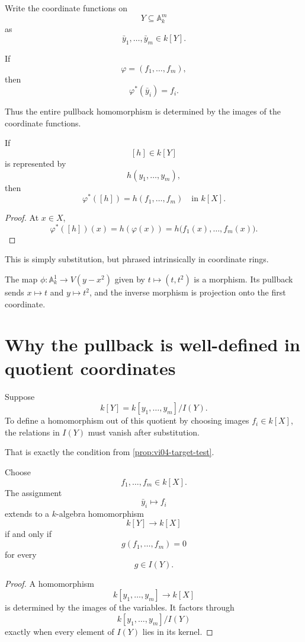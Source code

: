 Write the coordinate functions on
\[
Y\subseteq\mathbb A_k^m
\]
as
\[
\bar y_1,\dots,\bar y_m\in k[Y].
\]

If
\[
\varphi=(f_1,\dots,f_m),
\]
then
\[
\varphi^\ast(\bar y_i)=f_i.
\]

Thus the entire pullback homomorphism is determined by the images of the coordinate
functions.

\begin{proposition}
\label{prop:vi04-substitution}
If
\[
[h]\in k[Y]
\]
is represented by
\[
h(y_1,\dots,y_m),
\]
then
\[
\varphi^\ast([h])
=
h(f_1,\dots,f_m)
\quad\text{in }k[X].
\]
\end{proposition}

\begin{proof}
At \(x\in X\),
\[
\varphi^\ast([h])(x)
=
h(\varphi(x))
=
h\bigl(f_1(x),\dots,f_m(x)\bigr).
\]
\end{proof}

This is simply substitution, but phrased intrinsically in coordinate rings.

\begin{example}\label{ex:vi04-expand-01}
The map $\phi:\mathbb A^1_k\to V(y-x^2)$ given by $t\mapsto(t,t^2)$ is a morphism.  Its pullback sends $x\mapsto t$ and $y\mapsto t^2$, and the inverse morphism is projection onto the first coordinate.
\end{example}
\section{Why the pullback is well-defined in quotient coordinates}

Suppose
\[
k[Y]=k[y_1,\dots,y_m]/I(Y).
\]
To define a homomorphism out of this quotient by choosing images \(f_i\in k[X]\), the
relations in \(I(Y)\) must vanish after substitution.

That is exactly the condition from
\cref{prop:vi04-target-test}.

\begin{proposition}
\label{prop:vi04-quotient-criterion}
Choose
\[
f_1,\dots,f_m\in k[X].
\]
The assignment
\[
\bar y_i\longmapsto f_i
\]
extends to a \(k\)-algebra homomorphism
\[
k[Y]\longrightarrow k[X]
\]
if and only if
\[
g(f_1,\dots,f_m)=0
\]
for every
\[
g\in I(Y).
\]
\end{proposition}

\begin{proof}
A homomorphism
\[
k[y_1,\dots,y_m]\to k[X]
\]
is determined by the images of the variables.  It factors through
\[
k[y_1,\dots,y_m]/I(Y)
\]
exactly when every element of \(I(Y)\) lies in its kernel.
\end{proof}

